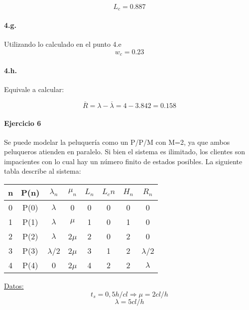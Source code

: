 \documentclass{article}
\begin{document}
    $$ L_c = 0.887$$
    
    \paragraph{4.g.} Utilizando lo calculado en el punto 4.e
    $$ w_c = 0.23 $$
    \paragraph{4.h.} Equivale a calcular:

    $$\overline{R} = \lambda - \overline{\lambda} = 4 - 3.842 = 0.158$$


    
    
    
\paragraph{Ejercicio 6}
    Se puede modelar la peluquería como un P/P/M con M=2, ya que ambos peluqueros atienden en paralelo. Si bien el sistema es ilimitado, los clientes son impacientes con lo cual hay un número finito de estados posibles.
    La siguiente tabla describe al sistema:
    \begin{center}
    \begin{tabular}{|| c | c | c | c | c | c | c | c ||}
    \hline 
     n & P(n) & $\lambda_n$ & $\mu_n$ & $L_n$& $L_cn$ & $H_n$ & $R_n$ \\ \hline \hline
     0 & P(0) & $\lambda$   & 0       & 0    & 0      & 0     & 0	\\ \hline
     1 & P(1) & $\lambda$   & $\mu$   & 1    & 0      & 1     & 0	\\ \hline
     2 & P(2) & $\lambda$   & 2$\mu$  & 2    & 0      & 2     & 0	\\ \hline
     3 & P(3) & $\lambda$/2 & 2$\mu$  & 3    & 1      & 2     & $\lambda$/2 \\ \hline
     4 & P(4) & 0           & 2$\mu$  & 4    & 2      & 2     & $\lambda$   \\ \hline  
     
    \end{tabular}
    \end{center}
    \underline{Datos:} \\
    $$t_s = 0,5 h/cl  \Rightarrow \mu = 2 cl/h $$
    $$\lambda = 5 cl/h $$
    
\end{document}
